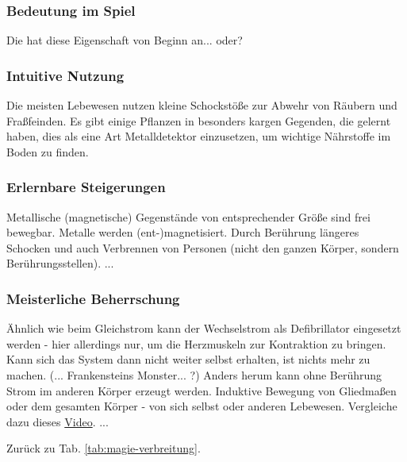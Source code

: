\subsubsection{Bedeutung im Spiel}
Die  hat diese Eigenschaft von Beginn an... oder?

\subsubsection{Intuitive Nutzung}
Die meisten Lebewesen nutzen kleine Schockstöße zur Abwehr von Räubern und Fraßfeinden. 
Es gibt einige Pflanzen in besonders kargen Gegenden, die gelernt haben, dies als eine Art Metalldetektor einzusetzen, um wichtige Nährstoffe im Boden zu finden.

\subsubsection{Erlernbare Steigerungen}
\begin{outline}
	\1 Metallische (magnetische) Gegenstände von entsprechender Größe sind frei bewegbar.
	\1 Metalle werden (ent-)magnetisiert.
	\1 Durch Berührung längeres Schocken und auch Verbrennen von Personen (nicht den ganzen Körper, sondern Berührungsstellen).
	\1 ...
\end{outline}

\subsubsection{Meisterliche Beherrschung} 
\begin{outline}
	\1 Ähnlich wie beim Gleichstrom kann der Wechselstrom als Defibrillator eingesetzt werden - hier allerdings nur, um die Herzmuskeln zur Kontraktion zu bringen.
	Kann sich das System dann nicht weiter selbst erhalten, ist nichts mehr zu machen.
	(... Frankensteins Monster... ?) %
	\1 Anders herum kann ohne Berührung Strom im anderen Körper erzeugt werden.
	\1 Induktive Bewegung von Gliedmaßen oder dem gesamten Körper - von sich selbst oder anderen Lebewesen.
	Vergleiche dazu dieses \href{https://www.youtube.com/watch?v=KlJsVqc0ywM}{Video}.
	\1 ...
\end{outline}
Zurück zu Tab. \ref{tab:magie-verbreitung}.















